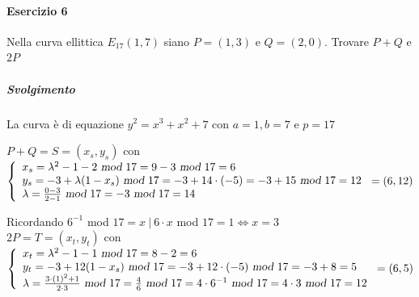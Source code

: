 \documentclass[10pt]{book}
\begin{document}
\paragraph{Esercizio 6} Nella curva ellittica $E_{17}(1,7)$ siano $P=(1,3)$ e $Q=(2,0)$. Trovare $P+Q$ e $2P$
\subparagraph{Svolgimento} La curva è di equazione $y^2 = x^3 + x^2 + 7$ con $a=1,b=7$ e $p=17$
\begin{list}{}{Formule a p. 48}
	\item $P+Q = S = (x_s, y_s)$ con $\left\{\begin{array}{l}
	x_s = \lambda^2 -1-2\textsl{ mod }17 = 9 - 3\textsl{ mod }17 = 6\\
	y_s = -3 +\lambda(1-x_s)\textsl{ mod }17 = -3 +14\cdot(-5) = -3 +15\textsl{ mod }17 = 12\\
	\lambda = \frac{0-3}{2-1}\textsl{ mod }17 = -3\textsl{ mod }17 = 14
	\end{array}\right. = (6,12)$
	\item Ricordando $6^{-1}$ mod $17 = x\:|\: 6\cdot x$ mod $17 = 1 \Leftrightarrow x = 3$\\
	$2P = T = (x_t, y_t)$ con $\left\{ \begin{array}{l}
	x_t = \lambda^2 -1-1\textsl{ mod }17 = 8-2 = 6\\
	y_t = -3 + 12(1-x_s)\textsl{ mod }17 = -3 + 12\cdot(-5)\textsl{ mod }17 = -3 +8 = 5\\
	\lambda = \frac{3\cdot\left(1\right)^2+1}{2\cdot3}\textsl{ mod }17 = \frac{4}{6}\textsl{ mod }17 = 4\cdot6^{-1}\textsl{ mod }17=4\cdot3\textsl{ mod }17 = 12
	\end{array}\right. = (6,5)$
\end{list}
\pagebreak
\end{document}
